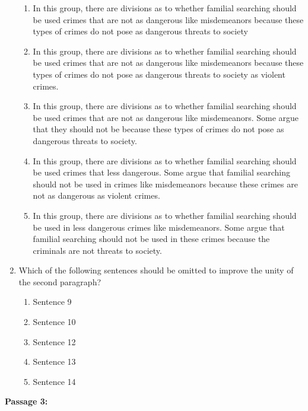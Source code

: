 \begin{enumerate}
\begin{enumerate}[label=(\Alph*)]
\item In this group, there are divisions as to whether familial searching should be used crimes that are not as dangerous like misdemeanors because these types of crimes do not pose as dangerous threats to society
\item In this group, there are divisions as to whether familial searching should be used crimes that are not as dangerous like misdemeanors because these types of crimes do not pose as dangerous threats to society as violent crimes.
\item In this group, there are divisions as to whether familial searching should be used crimes that are not as dangerous like misdemeanors. Some argue that they should not be because these types of crimes do not pose as dangerous threats to society.
\item In this group, there are divisions as to whether familial searching should be used crimes that less dangerous. Some argue that familial searching should not be used in crimes like misdemeanors because these crimes are not as dangerous as violent crimes.
\item In this group, there are divisions as to whether familial searching should be used in less dangerous crimes like misdemeanors. Some argue that familial searching should not be used in these crimes because the criminals are not threats to society.
\end{enumerate}

\item{Which of the following sentences should be omitted to improve the unity of the second paragraph?}
\begin{enumerate}[label=(\Alph*)]
\item{Sentence 9}
\item{Sentence 10}
\item{Sentence 12}
\item{Sentence 13}
\item{Sentence 14}
\end{enumerate}

\end{enumerate}

\bigskip
\textbf{Passage 3:}

